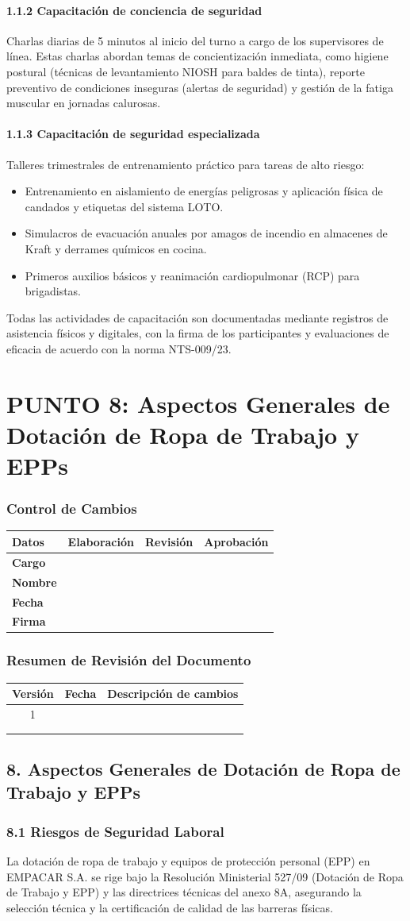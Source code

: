 \documentclass[11pt, letterpaper]{article}
\newcommand{\controlcambios}{
    \subsubsection*{Control de Cambios}
    \begin{table}[H]
        \centering
        \small
        \begin{tabular}{lp{4cm}p{4cm}p{4cm}}
            \toprule
            \textbf{Datos} & \textbf{Elaboración} & \textbf{Revisión} & \textbf{Aprobación} \\
            \midrule
            \textbf{Cargo} & & & \\
            \textbf{Nombre} & & & \\
            \textbf{Fecha} & & & \\
            \textbf{Firma} & & & \\
            \bottomrule
        \end{tabular}
    \end{table}
}
\newcommand{\resumenrevision}[1]{
    \subsubsection*{Resumen de Revisión del Documento}
    \begin{table}[H]
        \centering
        \small
        \begin{tabular}{ccp{8cm}}
            \toprule
            \textbf{Versión} & \textbf{Fecha} & \textbf{Descripción de cambios} \\
            \midrule
            #1 & & \\
            & & \\
            & & \\
            \bottomrule
        \end{tabular}
    \end{table}
}
\begin{document}
\paragraph{1.1.2 Capacitación de conciencia de seguridad}
Charlas diarias de 5 minutos al inicio del turno a cargo de los supervisores de línea. Estas charlas abordan temas de concientización inmediata, como higiene postural (técnicas de levantamiento NIOSH para baldes de tinta), reporte preventivo de condiciones inseguras (alertas de seguridad) y gestión de la fatiga muscular en jornadas calurosas.

\paragraph{1.1.3 Capacitación de seguridad especializada}
Talleres trimestrales de entrenamiento práctico para tareas de alto riesgo:
\begin{itemize}
    \item Entrenamiento en aislamiento de energías peligrosas y aplicación física de candados y etiquetas del sistema LOTO.
    \item Simulacros de evacuación anuales por amagos de incendio en almacenes de Kraft y derrames químicos en cocina.
    \item Primeros auxilios básicos y reanimación cardiopulmonar (RCP) para brigadistas.
\end{itemize}
Todas las actividades de capacitación son documentadas mediante registros de asistencia físicos y digitales, con la firma de los participantes y evaluaciones de eficacia de acuerdo con la norma NTS-009/23.
\newpage
\section{PUNTO 8: Aspectos Generales de Dotación de Ropa de Trabajo y EPPs}
\controlcambios
\resumenrevision{1}
\subsection{8. Aspectos Generales de Dotación de Ropa de Trabajo y EPPs}

\subsubsection{8.1 Riesgos de Seguridad Laboral}
La dotación de ropa de trabajo y equipos de protección personal (EPP) en EMPACAR S.A. se rige bajo la Resolución Ministerial 527/09 (Dotación de Ropa de Trabajo y EPP) y las directrices técnicas del anexo 8A, asegurando la selección técnica y la certificación de calidad de las barreras físicas.
\end{document}
